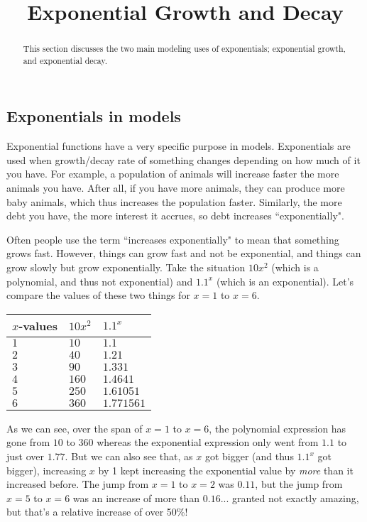 \documentclass{ximeraXloud}
\title{Exponential Growth and Decay}
\begin{document}
\begin{abstract}
    This section discusses the two main modeling uses of exponentials; exponential growth, and exponential decay.
\end{abstract}
\maketitle
    
\subsection*{Exponentials in models}
    
    Exponential functions have a very specific purpose in models. Exponentials are used when growth/decay rate of something changes depending on how much of it you have. For example, a population of animals will increase faster the more animals you have. After all, if you have more animals, they can produce more baby animals, which thus increases the population faster. Similarly, the more debt you have, the more interest it accrues, so debt increases ``exponentially".
    
    Often people use the term ``increases exponentially" to mean that something grows fast. However, things can grow fast and not be exponential, and things can grow slowly but grow exponentially. Take the situation $10x^2$ (which is a polynomial, and thus not exponential) and $1.1^x$ (which is an exponential). Let's compare the values of these two things for $x=1$ to $x=6$.
    
    \begin{center}
        \begin{tabular}{l|l|l}
            $x$-values & $10x^2$ & $1.1^x$ \\\hline
            $1$ & $10$ & $1.1$\\
            $2$ & $40$ & $1.21$\\
            $3$ & $90$ & $1.331$\\
            $4$ & $160$ & $1.4641$\\
            $5$ & $250$ & $1.61051$\\
            $6$ & $360$ & $1.771561$
        \end{tabular}
    \end{center}
    
    As we can see, over the span of $x=1$ to $x=6$, the polynomial expression has gone from $10$ to $360$ whereas the exponential expression only went from $1.1$ to just over $1.77$. But we can also see that, as $x$ got bigger (and thus $1.1^x$ got bigger), increasing $x$ by 1 kept increasing the exponential value by \textit{more} than it increased before. The jump from $x=1$ to $x=2$ was $0.11$, but the jump from $x=5$ to $x=6$ was an increase of more than $0.16$... granted not exactly amazing, but that's a relative increase of over 50\%!
    
\end{document}
